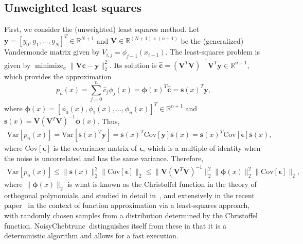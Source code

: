 \documentclass[final,onefignum,onetabnum]{siamart220329}
\def\mainalg{NoisyChebtrunc}
\DeclareMathOperator*{\minimize}{minimize}
\newcommand{\vct}[1]{\bm{#1}}
\newcommand{\mtx}[1]{\bm{#1}}
\begin{document}
\subsection{Unweighted least squares}
First, we consider the (unweighted) least squares method.
Let $\vct{y}=[y_0,y_1,\ldots,y_N]^T \in \mathbb{R}^{N+1}$ and $\mtx{V} \in \mathbb{R}^{(N+1) \times (n+1)}$ be the (generalized) Vandermonde matrix given by 
{$V_{i,j}=\phi_{j-1}(x_{i-1})$}. 
The least-squares problem is given by $\minimize_{\vct{c}} \|\mtx{V}\vct{c}-\vct{y}\|_2^2$.
Its solution is $\vct{\hat c} = (\mtx{V}^{T} \mtx{V})^{-1} \mtx{V}^{T} \vct{y}  \in \mathbb{R}^{n+1}$, which provides the approximation \begin{equation}
	\label{eq:px}
	p_n(x)=\sum_{j=0}^n \hat c_{j} \phi_j(x)=\vct{\phi}(x)^T\vct{\hat c} =\vct{s}(x)^T \vct{y}, \end{equation}
where $\vct{\phi}(x) = [\phi_0(x),\phi_1(x),\ldots, \phi_n(x)]^{T}  \in \mathbb{R}^{n+1}$ and $\vct{s}(x)=\mtx{V} (\mtx{V}^T \mtx{V})^{-1} \vct{\phi}(x)$.
Thus, 
\begin{align}
	\mbox{Var}[p_n(x)] =\mbox{Var}[\vct{s}(x)^T\vct{y}]=\vct{s}(x)^T\mbox{Cov}[\vct{y}]\vct{s}(x) =\vct{s}(x)^T\mbox{Cov}[\vct{\epsilon}]\vct{s}(x), \label{eq:varexact}
\end{align}
where $\mbox{Cov}[\vct{\epsilon}]$ is the covariance matrix of $\vct{\epsilon}$, which is a multiple of identity when the noise is uncorrelated and has the same variance. 
Therefore,  
\begin{align}  
	\mbox{Var}[p_n(x)] \leq \| \vct{s}(x) \|_2^2 \| \mbox{Cov}[\vct{\epsilon}] \|_2 \leq \| \mtx{V} (\mtx{V}^T \mtx{V})^{-1} \|_2^2 \| \vct{\phi}(x) \|_2^2 \|\mbox{Cov}[\vct{\epsilon}]\|_2,  \label{eq:vars}
\end{align}
where $\|\vct{\phi}(x)\|_2$ is what is known as the Christoffel function in the theory of orthogonal polynomials, and studied in detail in~\cite{nevai1986geza}, and extensively in the recent paper~\cite{adcock2024optimal} in the context of function approximation via a least-squares approach, with randomly chosen samples from a distribution determined by the Christoffel function. \mainalg\ distinguishes itself from these in that it is a deterministic algorithm and allows for a fast execution. 
\end{document}

